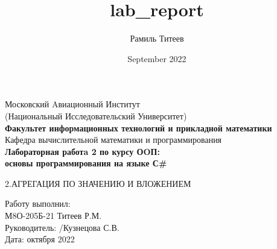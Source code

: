 \documentclass[12pt]{report}
\title{lab_report}
\author{Рамиль Титеев}
\date{September 2022}
\begin{document}
    \begin{titlepage}
        \begin{center}
            \large{Московский Aвиационный Институт}\\
            \large{(Национальный Исследовательский Университет)}\\
            \vspace{0.4in}
            \textbf{\LARGE{Факультет информационных технологий и прикладной математики}}\\
            \vspace{0.4in}
            \large{Кафедра вычислительной математики и программирования}\\
            \vspace{0.4in}
            \textbf{\LARGE{Лабораторная работa 2 по курсу ОOП:}}\\
            \textbf{\LARGE{основы программирования на языке С\#}}\\
        \end{center}
        \vspace{0.6in}
        \small{2.АГРЕГАЦИЯ ПО ЗНАЧЕНИЮ И ВЛОЖЕНИЕМ }\\
        \vfill
        \begin{flushleft}
                \large{ 
                    Работу выполнил:\\
                    М8О-205Б-21 \hspace{0.1in} 
                    Титеев Р.М. \hspace{0.3in}  
                    \hspace{0.3in} 
                    \\ 
                    Руководитель: /Кузнецова С.В. \\
                    Дата: \underline{\hspace{0.4in}} октября 2022\\
                }
        \end{flushleft}        
    \end{titlepage}
\end{document}
